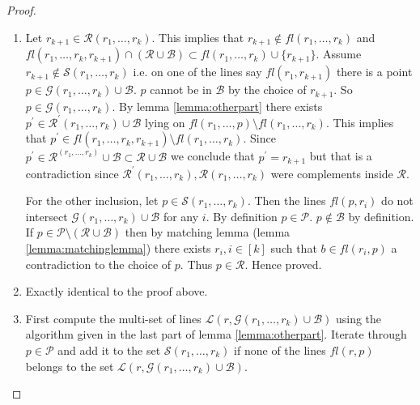 \documentclass[12pt]{caltech_thesis}
\theoremstyle{plain}
\theoremstyle{definition}
\newcommand{\MS}{\mathcal{S}}
\newcommand{\MB}{\mathcal{B}}
\newcommand{\ML}{\mathcal{L}}
\newcommand{\MP}{\mathcal{P}}
\newcommand{\MR}{\mathcal{R}}
\newcommand{\MG}{\mathcal{G}}
\begin{document}
 \begin{proof}
 \begin{enumerate}
  \item Let $r_{k+1}\in \MR(r_1,\ldots,r_k)$. This implies that $r_{k+1}\notin fl(r_1,\ldots,r_k)$ and
  $fl(r_1,\ldots,r_k,r_{k+1})\cap (\MR\cup \MB)\subset fl(r_1,\ldots,r_k)\cup \{r_{k+1}\}$. Assume $r_{k+1}\notin \MS(r_1,\ldots,r_k)$ i.e.
  on one of the lines say $fl(r_1,r_{k+1})$ there is a point $p \in \MG(r_1,\ldots,r_k)\cup \MB$. $p$ cannot be in $\MB$ by the choice of 
  $r_{k+1}$. So $p\in \MG(r_1,\ldots,r_k)$. By lemma \ref{lemma:otherpart} there exists $p^\prime \in \MR^\prime(r_1,\ldots,r_k)\cup \MB$
  lying on $fl(r_1,\ldots,p)\setminus fl(r_1,\ldots,r_k)$. This implies that $p^\prime \in 
  fl(r_1,\ldots,r_k,r_{k+1})\setminus fl(r_1,\ldots,r_k)$. Since $p^\prime \in \MR^(r_1,\ldots,r_k)\cup \MB \subset \MR\cup \MB$ we 
  conclude that $p^\prime = r_{k+1}$ but that is a contradiction since $\MR^\prime(r_1,\ldots,r_k), \MR(r_1,\ldots,r_k)$ were complements
  inside $\MR$. 
  
  For the other inclusion, let $p\in \MS(r_1,\ldots,r_k)$. Then the lines $fl(p,r_i)$ do not intersect $\MG(r_1,\ldots,r_k)\cup \MB$
  for any $i$. By definition $p\in \MP$. $p\notin \MB$ by definition.  If $p\in \MP\setminus (\MR\cup \MB)$ then by matching lemma 
  (lemma \ref{lemma:matchinglemma}) there exists $r_i,i\in [k]$ such that $b\in fl(r_i,p)$ a contradiction to the choice of $p$. Thus
  $p\in \MR$. Hence proved.
  \item Exactly identical to the proof above.
  
  \item First compute the multi-set of lines $\ML(r,\MG(r_1,\ldots,r_k)\cup \MB)$ using the algorithm given in the last part
  of lemma \ref{lemma:otherpart}. Iterate through $p\in \MP$ and add it to the 
  set $\MS(r_1,\ldots,r_k)$ if none of the lines $fl(r,p)$ belongs to the set $\ML(r,\MG(r_1,\ldots,r_k)\cup \MB)$.
 \end{enumerate}

 \end{proof}

 
 
\end{document}
